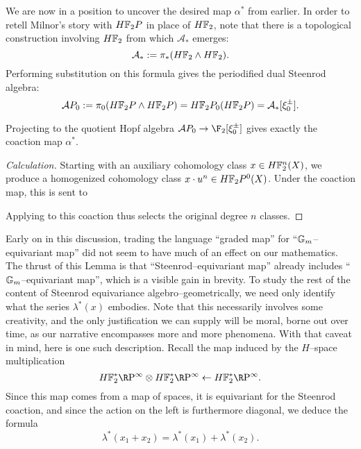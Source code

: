We are now in a position to uncover the desired map $\alpha^*$ from earlier.  In order to retell Milnor's story with $\HFtwo P$ in place of $\HFtwo$, note that there is a topological construction involving $\HFtwo$ from which $\mathcal A_*$ emerges: \[\mathcal A_* := \pi_*(\HFtwo \sm \HFtwo).\]  Performing substitution on this formula gives the periodified dual Steenrod algebra: \[\mathcal AP_0 := \pi_0 (\HFtwo P \sm \HFtwo P) = \HFtwo P_0(\HFtwo P) = \mathcal A_*[\xi_0^\pm].\]

\begin{lemma}
Projecting to the quotient Hopf algebra $\mathcal AP_0 \to \F_2[\xi_0^\pm]$ gives exactly the coaction map $\alpha^*$.
\end{lemma}
\begin{proof}[Calculation]
Starting with an auxiliary cohomology class $x \in \HFtwo^n(X)$, we produce a homogenized cohomology class $x \cdot u^n \in \HFtwo P^0(X)$.  Under the coaction map, this is sent to
\begin{center}
\end{center}
Applying  to this coaction thus selects the original degree $n$ classes.
\end{proof}

Early on in this discussion, trading the language ``graded map'' for ``$\mathbb G_m$--equivariant map'' did not seem to have much of an effect on our mathematics.  The thrust of this Lemma is that ``Steenrod--equivariant map'' already includes ``$\mathbb G_m$--equivariant map'', which is a visible gain in brevity.  To study the rest of the content of Steenrod equivariance algebro--geometrically, we need only identify what the series $\lambda^*(x)$ embodies.  Note that this necessarily involves some creativity, and the only justification we can supply will be moral, borne out over time, as our narrative encompasses more and more phenomena.  With that caveat in mind, here is one such description.  Recall the map induced by the $H$--space multiplication \[\HFtwo^* \RP^\infty \otimes \HFtwo^* \RP^\infty \leftarrow \HFtwo^* \RP^\infty.\]  Since this map comes from a map of spaces, it is equivariant for the Steenrod coaction, and since the action on the left is furthermore diagonal, we deduce the formula \[\lambda^*(x_1 + x_2) = \lambda^*(x_1) + \lambda^*(x_2).\]


